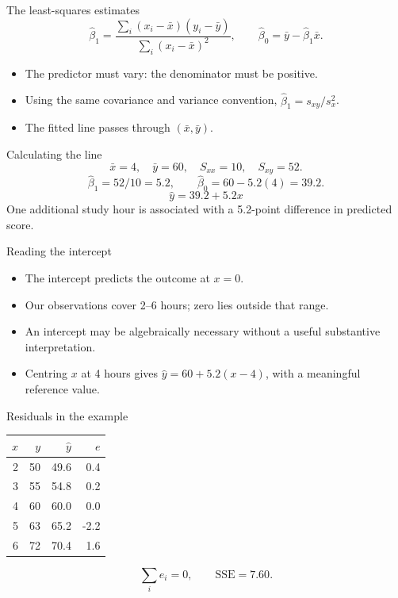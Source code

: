 \begin{frame}{The least-squares estimates}
\[\hat\beta_1=\frac{\sum_i(x_i-\bar x)(y_i-\bar y)}{\sum_i(x_i-\bar x)^2},\qquad\hat\beta_0=\bar y-\hat\beta_1\bar x.\]\begin{itemize}
\item The predictor must vary: the denominator must be positive.
\item Using the same covariance and variance convention, $\hat\beta_1=s_{xy}/s_x^2$.
\item The fitted line passes through $(\bar x,\bar y)$.
\end{itemize}
\end{frame}

\begin{frame}{Calculating the line}
\[\bar x=4,\quad\bar y=60,\quad S_{xx}=10,\quad S_{xy}=52.\]\[\hat\beta_1=52/10=5.2,\qquad\hat\beta_0=60-5.2(4)=39.2.\]\[\boxed{\hat y=39.2+5.2x}\]One additional study hour is associated with a 5.2-point difference in predicted score.
\end{frame}

\begin{frame}{Reading the intercept}
\begin{itemize}
\item The intercept predicts the outcome at $x=0$.
\item Our observations cover 2--6 hours; zero lies outside that range.
\item An intercept may be algebraically necessary without a useful substantive interpretation.
\item Centring $x$ at 4 hours gives $\hat y=60+5.2(x-4)$, with a meaningful reference value.
\end{itemize}
\end{frame}

\begin{frame}{Residuals in the example}
\begin{center}\begin{tabular}{rrrr}\toprule
$x$ & $y$ & $\hat y$ & $e$\\\midrule 2 & 50 & 49.6 & 0.4\\3 & 55 & 54.8 & 0.2\\4 & 60 & 60.0 & 0.0\\5 & 63 & 65.2 & -2.2\\6 & 72 & 70.4 & 1.6\\
\bottomrule\end{tabular}\end{center}\[\sum_i e_i=0,\qquad \mathrm{SSE}=7.60.\]
\end{frame}

